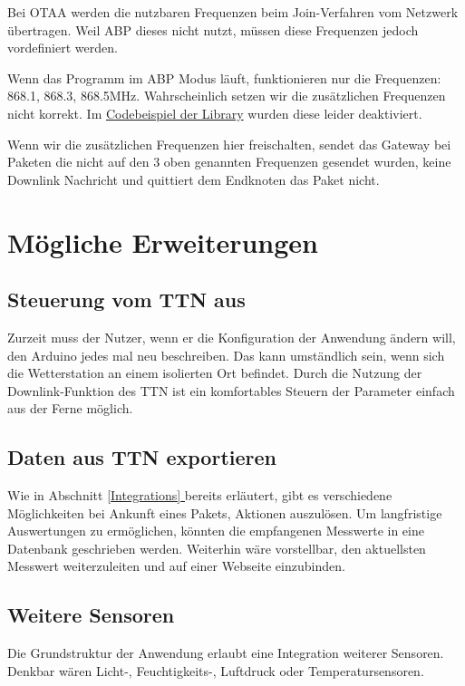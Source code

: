 \documentclass[12pt]{article}
\newcommand*{\fullref}[1]{\hyperref[{#1}]{\ref{#1} \nameref{#1}}}   %
\begin{document}
        Bei OTAA werden die nutzbaren Frequenzen beim Join-Verfahren vom Netzwerk übertragen.
        Weil ABP dieses nicht nutzt, müssen diese Frequenzen jedoch vordefiniert werden.

        Wenn das Programm im ABP Modus läuft, funktionieren nur die Frequenzen: 868.1, 868.3, 868.5MHz.
        Wahrscheinlich setzen wir die zusätzlichen Frequenzen nicht korrekt.
        Im \href{https://github.com/dragino/arduino-lmic/blob/f2775468e19b2c2a35557ef2f8255cffb2a783be/examples/ttn-abp/ttn-abp.ino#L180}{Codebeispiel der Library}
        wurden diese leider deaktiviert.

        Wenn wir die zusätzlichen Frequenzen hier freischalten, sendet das Gateway bei Paketen die nicht auf den 3 oben genannten Frequenzen gesendet wurden, keine Downlink Nachricht
        und quittiert dem Endknoten das Paket nicht.

  \newpage

  \section{Mögliche Erweiterungen}

    \subsection{Steuerung vom TTN aus}
      Zurzeit muss der Nutzer, wenn er die Konfiguration der Anwendung ändern will, den Arduino jedes mal neu beschreiben.
      Das kann umständlich sein, wenn sich die Wetterstation an einem isolierten Ort befindet.
      Durch die Nutzung der Downlink-Funktion des TTN ist ein komfortables Steuern der Parameter einfach aus der Ferne möglich.

    \subsection{Daten aus TTN exportieren}
      Wie in Abschnitt \underline{\fullref{Integrations}} bereits erläutert,
      gibt es verschiedene Möglichkeiten bei Ankunft eines Pakets, Aktionen auszulösen.
      Um langfristige Auswertungen zu ermöglichen, könnten die empfangenen Messwerte in eine Datenbank geschrieben werden.
      Weiterhin wäre vorstellbar, den aktuellsten Messwert weiterzuleiten und auf einer Webseite einzubinden.

    \subsection{Weitere Sensoren}
      Die Grundstruktur der Anwendung erlaubt eine Integration weiterer Sensoren.
      Denkbar wären Licht-, Feuchtigkeits-, Luftdruck oder Temperatursensoren.
\end{document}
